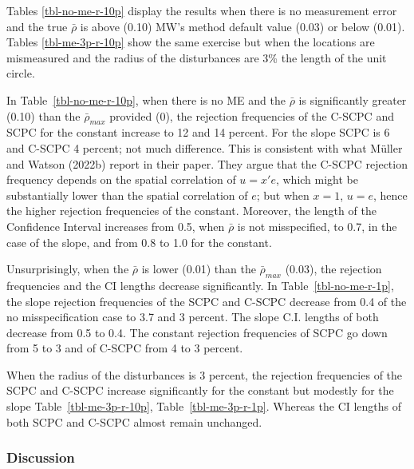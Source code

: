 \documentclass[
]{article}
\begin{document}
Tables \ref{tbl-no-me-r-10p} display the results when there is no
measurement error and the true \(\bar\rho\) is above (0.10) MW's method
default value (0.03) or below (0.01). Tables \ref{tbl-me-3p-r-10p} show
the same exercise but when the locations are mismeasured and the radius
of the disturbances are 3\% the length of the unit circle.

In Table~\ref{tbl-no-me-r-10p}, when there is no ME and the \(\bar\rho\)
is significantly greater (0.10) than the \(\bar\rho_{max}\) provided
(0), the rejection frequencies of the C-SCPC and SCPC for the constant
increase to 12 and 14 percent. For the slope SCPC is 6 and C-SCPC 4
percent; not much difference. This is consistent with what Müller and
Watson (2022b) report in their paper. They argue that the C-SCPC
rejection frequency depends on the spatial correlation of \(u=x'e\),
which might be substantially lower than the spatial correlation of
\(e\); but when \(x=1\), \(u=e\), hence the higher rejection frequencies
of the constant. Moreover, the length of the Confidence Interval
increases from 0.5, when \(\bar\rho\) is not misspecified, to 0.7, in
the case of the slope, and from 0.8 to 1.0 for the constant.

Unsurprisingly, when the \(\bar\rho\) is lower (0.01) than the
\(\bar\rho_{max}\) (0.03), the rejection frequencies and the CI lengths
decrease significantly. In Table~\ref{tbl-no-me-r-1p}, the slope
rejection frequencies of the SCPC and C-SCPC decrease from 0.4 of the no
misspecification case to 3.7 and 3 percent. The slope C.I. lengths of
both decrease from 0.5 to 0.4. The constant rejection frequencies of
SCPC go down from 5 to 3 and of C-SCPC from 4 to 3 percent.

When the radius of the disturbances is 3 percent, the rejection
frequencies of the SCPC and C-SCPC increase significantly for the
constant but modestly for the slope
Table~\ref{tbl-me-3p-r-10p}, Table~\ref{tbl-me-3p-r-1p}. Whereas the CI
lengths of both SCPC and C-SCPC almost remain unchanged.

\hypertarget{sec-me-diss}{%
\subsubsection{Discussion}\label{sec-me-diss}}
\end{document}
